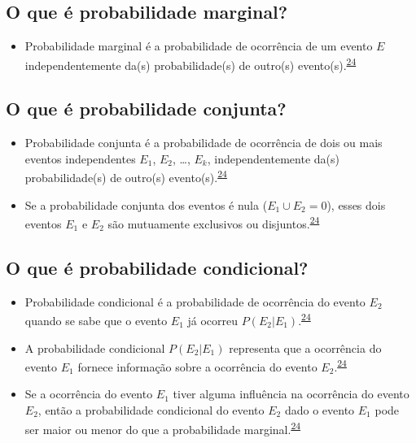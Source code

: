 \documentclass[
  a4paper,
]{book}
\providecommand{\tightlist}{%
  \setlength{\itemsep}{0pt}\setlength{\parskip}{0pt}}
\begin{document}
\hypertarget{o-que-uxe9-probabilidade-marginal}{%
\subsection{O que é probabilidade marginal?}\label{o-que-uxe9-probabilidade-marginal}}

\begin{itemize}
\tightlist
\item
  Probabilidade marginal é a probabilidade de ocorrência de um evento \(E\) independentemente da(s) probabilidade(s) de outro(s) evento(s).\textsuperscript{\protect\hyperlink{ref-grami2023}{24}}
\end{itemize}

\hypertarget{o-que-uxe9-probabilidade-conjunta}{%
\subsection{O que é probabilidade conjunta?}\label{o-que-uxe9-probabilidade-conjunta}}

\begin{itemize}
\item
  Probabilidade conjunta é a probabilidade de ocorrência de dois ou mais eventos independentes \(E_{1}\), \(E_{2}\), \ldots, \(E_{k}\), independentemente da(s) probabilidade(s) de outro(s) evento(s).\textsuperscript{\protect\hyperlink{ref-grami2023}{24}}
\item
  Se a probabilidade conjunta dos eventos é nula (\(E_{1} \cup E_{2} = 0\)), esses dois eventos \(E_{1}\) e \(E_{2}\) são mutuamente exclusivos ou disjuntos.\textsuperscript{\protect\hyperlink{ref-grami2023}{24}}
\end{itemize}

\hypertarget{o-que-uxe9-probabilidade-condicional}{%
\subsection{O que é probabilidade condicional?}\label{o-que-uxe9-probabilidade-condicional}}

\begin{itemize}
\item
  Probabilidade condicional é a probabilidade de ocorrência do evento \(E_{2}\) quando se sabe que o evento \(E_{1}\) já ocorreu \(P(E_{2} | E_{1})\).\textsuperscript{\protect\hyperlink{ref-grami2023}{24}}
\item
  A probabilidade condicional \(P(E_{2} | E_{1})\) representa que a ocorrência do evento \(E_{1}\) fornece informação sobre a ocorrência do evento \(E_{2}\).\textsuperscript{\protect\hyperlink{ref-grami2023}{24}}
\item
  Se a ocorrência do evento \(E_{1}\) tiver alguma influência na ocorrência do evento \(E_{2}\), então a probabilidade condicional do evento \(E_{2}\) dado o evento \(E_{1}\) pode ser maior ou menor do que a probabilidade marginal.\textsuperscript{\protect\hyperlink{ref-grami2023}{24}}
\end{itemize}
\end{document}
